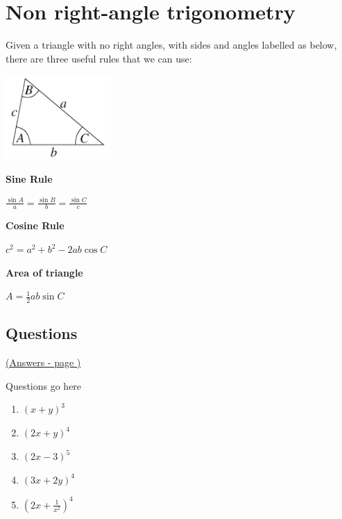 \documentclass[../main.tex]{subfiles}
\begin{document}
\section{Non right-angle trigonometry}
Given a triangle with no right angles, with sides and angles labelled as below, there are three useful rules that we can use:

\includegraphics[width=4cm]{images/nonrighttrig.png}

\textbf{Sine Rule}

\(\frac{\sin{A}}{a}=\frac{\sin{B}}{b}=\frac{\sin{C}}{c}\)

\textbf{Cosine Rule}

\(c^2=a^2+b^2-2ab\cos{C}\)

\textbf{Area of triangle}

\(A=\frac{1}{2}ab\sin{C}\)

\pagebreak
\hypertarget{nonrighttriglink}{\subsection*{Questions}}
\hyperlink{nonrighttriganswers}{(Answers - page {\pageref*{Non right trig answers}})}

\label{Non right trig}
Questions go here


\begin{enumerate}
    \item \( (x+y)^3 \)
    \item \( (2x+y)^4 \)
    \item \( (2x-3)^5 \)
    \item \( (3x+2y)^4 \)
    \item \( (2x + \frac{1}{x^2 } )^4 \)
\end{enumerate}
\end{document}
